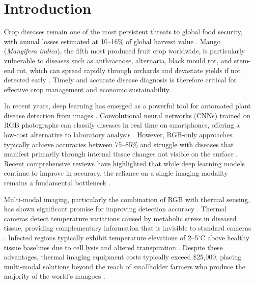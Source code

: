 \documentclass[utf8]{FrontiersinHarvard} %
\begin{document}
\section{Introduction}

Crop diseases remain one of the most persistent threats to global food security, with annual losses estimated at 10--16\% of global harvest value \cite{fao2021,fao2023,savary2019}. Mango (\textit{Mangifera indica}), the fifth most produced fruit crop worldwide, is particularly vulnerable to diseases such as anthracnose, alternaria, black mould rot, and stem-end rot, which can spread rapidly through orchards and devastate yields if not detected early \cite{singh2019}. Timely and accurate disease diagnosis is therefore critical for effective crop management and economic sustainability.

In recent years, deep learning has emerged as a powerful tool for automated plant disease detection from images \cite{mohanty2016,ferentinos2018,thakur2022}. Convolutional neural networks (CNNs) trained on RGB photographs can classify diseases in real time on smartphones, offering a low-cost alternative to laboratory analysis \cite{kamilaris2018,coulibaly2022}. However, RGB-only approaches typically achieve accuracies between 75--85\% and struggle with diseases that manifest primarily through internal tissue changes not visible on the surface \cite{pineda2021,abade2021}. Recent comprehensive reviews have highlighted that while deep learning models continue to improve in accuracy, the reliance on a single imaging modality remains a fundamental bottleneck \cite{thakur2022,hasan2024}.

Multi-modal imaging, particularly the combination of RGB with thermal sensing, has shown significant promise for improving detection accuracy \cite{khanal2017,maimaitijiang2020}. Thermal cameras detect temperature variations caused by metabolic stress in diseased tissue, providing complementary information that is invisible to standard cameras \cite{mahlein2016,pineda2021}. Infected regions typically exhibit temperature elevations of 2--5$^{\circ}$C above healthy tissue baselines due to cell lysis and altered transpiration \cite{mahlein2016}. Despite these advantages, thermal imaging equipment costs typically exceed \$25,000, placing multi-modal solutions beyond the reach of smallholder farmers who produce the majority of the world's mangoes \cite{sishodia2020}.
\end{document}
